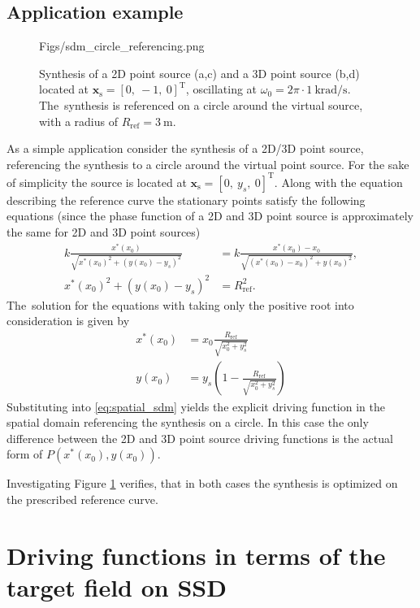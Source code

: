 \documentclass[12pt,a4paper]{article}
\newcommand{\vxs}{\mathbf{x}_{\mathrm{s}}}
\begin{document}
\subsection{Application example}
\begin{figure}
	\centering
	\begin{overpic}[width = .95\columnwidth ]{Figs/sdm_circle_referencing.png}
	\scriptsize
	\end{overpic}
	\caption{Synthesis of a 2D point source (a,c) and a 3D point source (b,d) located at $\vxs = [0,\ -1,\ 0]^\mathrm{T}$, oscillating at $\omega_0 = 2\pi \cdot 1 ~\mathrm{krad/s}$.
	The~synthesis is referenced on a circle around the virtual source, with a radius of $R_{\mathrm{ref}} = 3~\mathrm{m}$.}
	\label{fig:sdm_spatial_1}
\end{figure}
As a simple application consider the synthesis of a 2D/3D point source, referencing the synthesis to a circle around the virtual point source.
For the sake of simplicity the source is located at $\vxs = [0,\ y_s,\ 0]^{\mathrm{T}}$. Along with the equation describing the reference curve the stationary points satisfy the following equations (since the phase function of a 2D and 3D point source is approximately the same for 2D and 3D point sources)
%
\begin{align}
k \frac{x^*(x_0)}{\sqrt{x^*(x_0)^2 + (y(x_0)-y_s)^2}} &= k \frac{x^*(x_0)-x_0}{\sqrt{(x^*(x_0)-x_0)^2 + y(x_0)^2}}, \\
x^*(x_0)^2 + (y(x_0)-y_s)^2     &= R_{\mathrm{ref}}^2.
\end{align}
The~solution for the equations with taking only the positive root into consideration is given by
\begin{align}
x^*(x_0) &= x_0 \frac{ R_{\mathrm{ref}}}{\sqrt{x_0^2 + y_s^2}} \\
y(x_0) 	 &= y_s \left( 1 -  \frac{R_{\mathrm{ref}}}{\sqrt{x_0^2 + y_s^2}}\right)
\end{align}
Substituting into \eqref{eq:spatial_sdm} yields the explicit driving function in the spatial domain referencing the synthesis on a circle.
In this case the only difference between the 2D and 3D point source driving functions is the actual form of $P(x^*(x_0),y(x_0))$.

Investigating Figure \ref{fig:sdm_spatial_1} verifies, that in both cases the synthesis is optimized on the prescribed reference curve.

\newpage
\section{Driving functions in terms of the target field on SSD}
\end{document}
